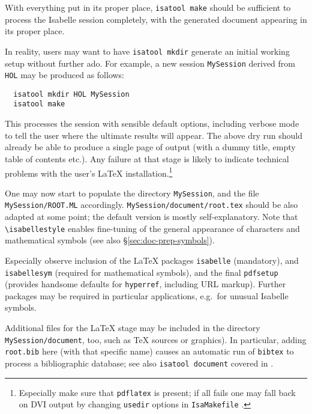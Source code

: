 \begin{isabellebody}
\begin{isamarkuptext}
\begin{itemize}
  \end{itemize}

  With everything put in its proper place, \texttt{isatool make}
  should be sufficient to process the Isabelle session completely,
  with the generated document appearing in its proper place.

  \medskip In reality, users may want to have \texttt{isatool mkdir}
  generate an initial working setup without further ado.  For example,
  a new session \texttt{MySession} derived from \texttt{HOL} may be
  produced as follows:

\begin{verbatim}
  isatool mkdir HOL MySession
  isatool make
\end{verbatim}

  This processes the session with sensible default options, including
  verbose mode to tell the user where the ultimate results will
  appear.  The above dry run should already be able to produce a
  single page of output (with a dummy title, empty table of contents
  etc.).  Any failure at that stage is likely to indicate technical
  problems with the user's {\LaTeX} installation.\footnote{Especially
  make sure that \texttt{pdflatex} is present; if all fails one may
  fall back on DVI output by changing \texttt{usedir} options in
  \texttt{IsaMakefile} \cite{isabelle-sys}.}

  \medskip One may now start to populate the directory
  \texttt{MySession}, and the file \texttt{MySession/ROOT.ML}
  accordingly.  \texttt{MySession/document/root.tex} should be also
  adapted at some point; the default version is mostly
  self-explanatory.  Note that \verb,\isabellestyle, enables
  fine-tuning of the general appearance of characters and mathematical
  symbols (see also \S\ref{sec:doc-prep-symbols}).

  Especially observe inclusion of the {\LaTeX} packages
  \texttt{isabelle} (mandatory), and \texttt{isabellesym} (required
  for mathematical symbols), and the final \texttt{pdfsetup} (provides
  handsome defaults for \texttt{hyperref}, including URL markup).
  Further packages may be required in particular applications, e.g.\
  for unusual Isabelle symbols.

  \medskip Additional files for the {\LaTeX} stage may be included in
  the directory \texttt{MySession/document}, too, such as {\TeX}
  sources or graphics).  In particular, adding \texttt{root.bib} here
  (with that specific name) causes an automatic run of \texttt{bibtex}
  to process a bibliographic database; see also \texttt{isatool
  document} covered in \cite{isabelle-sys}.


\end{isamarkuptext}
\end{isabellebody}
